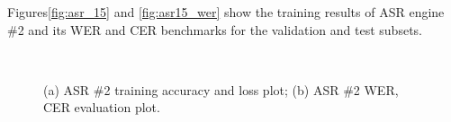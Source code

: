 Figures\;\ref{fig:asr_15} and \;\ref{fig:asr15_wer} show
the training results of ASR engine \#2 and its
WER and CER benchmarks for the validation and test subsets.
\begin{figure}[H]
    \centering
    \\
    \vspace{-0.3cm}
    \caption{(a) ASR \#2 training accuracy and loss plot;\;\;
        (b) ASR \#2 WER, CER evaluation plot.}\label{fig:asr15_wer_subplot} 
\end{figure}

